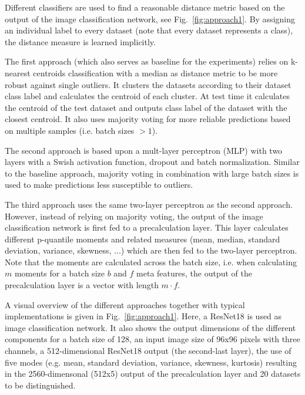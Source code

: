 \documentclass{article}
\begin{document}
Different classifiers are used to find a reasonable distance metric based on the output of the image classification network, see Fig.~\ref{fig:approach1}. By assigning an individual label to every dataset (note that every dataset represents a class), the distance measure is learned implicitly.

The first approach (which also serves as baseline for the experiments) relies on k-nearest centroids classification with a median as distance metric to be more robust against single outliers. It clusters the datasets according to their dataset class label and calculates the centroid of each cluster.
At test time it calculates the centroid of the test dataset and outputs class label of the dataset with the closest centroid. It also uses majority voting for more reliable predictions based on multiple samples (i.e. batch sizes $>1$).

The second approach is based upon a mult-layer perceptron (MLP) with two layers with a Swish activation function, dropout and batch normalization. Similar to the baseline approach, majority voting in combination with large batch sizes is used to make predictions less susceptible to outliers.

The third approach uses the same two-layer perceptron as the second approach. However, instead of relying on majority voting, the output of the image classification network is first fed to a precalculation layer. This layer calculates different p-quantile moments and related measures (mean, median, standard deviation, variance, skewness, ...) which are then fed to the two-layer perceptron. Note that the moments are calculated across the batch size, i.e. when calculating $m$ moments for a batch size $b$ and $f$ meta features, the output of the precalculation layer is a vector with length $m \cdot f$. 

A visual overview of the different approaches together with typical implementations is given in Fig.~\ref{fig:approach1}. Here, a ResNet18 is used as image classification network. It also shows the output dimensions of the different components for a batch size of 128, an input image size of 96x96 pixels with three channels, a 512-dimensional ResNet18 output (the second-last layer), the use of five modes (e.g. mean, standard deviation, variance, skewness, kurtosis) resulting in the 2560-dimensonal (512x5) output of the precalculation layer and 20 datasets to be distinguished.
\end{document}
